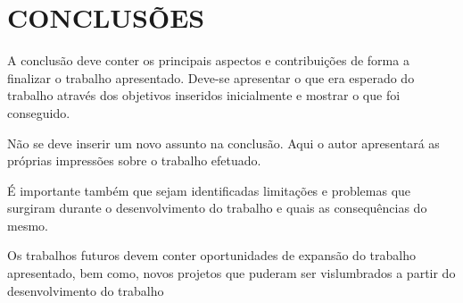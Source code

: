 \chapter{CONCLUSÕES}
A conclusão deve conter os principais aspectos e contribuições de forma a finalizar o trabalho apresentado. Deve-se apresentar o que era esperado do trabalho através dos objetivos inseridos inicialmente e mostrar o que foi conseguido. 

	Não se deve inserir um novo assunto na conclusão. Aqui o autor apresentará as próprias impressões sobre o trabalho efetuado. 
    
É importante também que sejam identificadas limitações e problemas que surgiram durante o desenvolvimento do trabalho e quais as consequências do mesmo.

Os trabalhos futuros devem conter oportunidades de expansão do trabalho apresentado, bem como, novos projetos que puderam ser vislumbrados a partir do desenvolvimento do trabalho